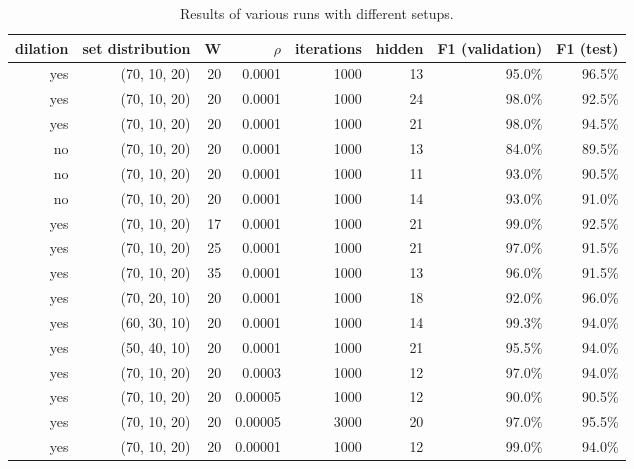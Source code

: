 \documentclass[report.tex]{subfile}
\begin{document}
\begin{table}[h]
    \centering
    \begin{tabular}{rrrrr|rrr}
        dilation & set distribution & W & $\rho$ & iterations &
        hidden & F1 (validation) & F1 (test) \\\hline

        yes & (70, 10, 20) & 20 & 0.0001  & 1000 & 13 & 95.0\% & 96.5\% \\
        yes & (70, 10, 20) & 20 & 0.0001  & 1000 & 24 & 98.0\% & 92.5\% \\
        yes & (70, 10, 20) & 20 & 0.0001  & 1000 & 21 & 98.0\% & 94.5\% \\
        no  & (70, 10, 20) & 20 & 0.0001  & 1000 & 13 & 84.0\% & 89.5\% \\
        no  & (70, 10, 20) & 20 & 0.0001  & 1000 & 11 & 93.0\% & 90.5\% \\
        no  & (70, 10, 20) & 20 & 0.0001  & 1000 & 14 & 93.0\% & 91.0\% \\
        yes & (70, 10, 20) & 17 & 0.0001  & 1000 & 21 & 99.0\% & 92.5\% \\
        yes & (70, 10, 20) & 25 & 0.0001  & 1000 & 21 & 97.0\% & 91.5\% \\
        yes & (70, 10, 20) & 35 & 0.0001  & 1000 & 13 & 96.0\% & 91.5\% \\
        yes & (70, 20, 10) & 20 & 0.0001  & 1000 & 18 & 92.0\% & 96.0\% \\
        yes & (60, 30, 10) & 20 & 0.0001  & 1000 & 14 & 99.3\% & 94.0\% \\
        yes & (50, 40, 10) & 20 & 0.0001  & 1000 & 21 & 95.5\% & 94.0\% \\
        yes & (70, 10, 20) & 20 & 0.0003  & 1000 & 12 & 97.0\% & 94.0\% \\
        yes & (70, 10, 20) & 20 & 0.00005 & 1000 & 12 & 90.0\% & 90.5\% \\
        yes & (70, 10, 20) & 20 & 0.00005 & 3000 & 20 & 97.0\% & 95.5\% \\
        yes & (70, 10, 20) & 20 & 0.00001 & 1000 & 12 & 99.0\% & 94.0\% \\
    \end{tabular}
    \caption{Results of various runs with different setups.}
    \label{fig:runs}
\end{table}
\end{document}
